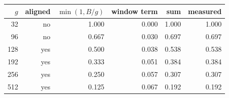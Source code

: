 \begin{tabular}{rrrrrr}
\toprule
$g$ & aligned & $\min(1,B/g)$ & window term & sum & measured \\
\midrule
32 & no & 1.000 & 0.000 & 1.000 & 1.000 \\
96 & no & 0.667 & 0.030 & 0.697 & 0.697 \\
128 & yes & 0.500 & 0.038 & 0.538 & 0.538 \\
192 & yes & 0.333 & 0.051 & 0.384 & 0.384 \\
256 & yes & 0.250 & 0.057 & 0.307 & 0.307 \\
512 & yes & 0.125 & 0.067 & 0.192 & 0.192 \\
\bottomrule
\end{tabular}
